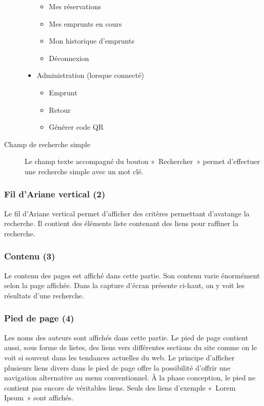 \documentclass[letter, 11pt, draft]{report}
\begin{document}
\begin{description}
\begin{itemize}
\begin{itemize}
				\item Mes réservations
				\item Mes emprunts en cours
				\item Mon historique d'emprunts
				\item Déconnexion
			\end{itemize}
		\end{itemize}
			\begin{itemize}
			\item Administration (lorsque connecté)
			\begin{itemize}
				\item Emprunt
				\item Retour
				\item Générer code QR
			\end{itemize}
		\end{itemize}
	\item[Champ de recherche simple] Le champ texte accompagné du bouton «~Rechercher~» permet d'effectuer une recherche simple avec un mot clé.
\end{description}

\subsubsection{Fil d'Ariane vertical (2)}
Le fil d'Ariane vertical permet d'afficher des critères permettant d'avatange la recherche. Il contient des éléments liste contenant des liens pour raffiner la recherche.

\subsubsection{Contenu (3)}
Le contenu des pages est affiché dans cette partie. Son contenu varie énormément selon la page affichée. Dans la capture d'écran présente ci-haut, on y voit les résultats d'une recherche.

\subsubsection{Pied de page (4)}
Les noms des auteurs sont affichés dans cette partie. Le pied de page contient aussi, sous forme de listes, des liens vers différentes sections du site comme on le voit si souvent dans les tendances actuelles du web. Le principe d'afficher plusieurs liens divers dans le pied de page offre la possibilité d'offrir une navigation alternative au menu conventionnel. À la phase conception, le pied ne contient pas encore de véritables liens. Seuls des liens d'exemple «~Lorem Ipsum~» sont affichés.
\end{document}
